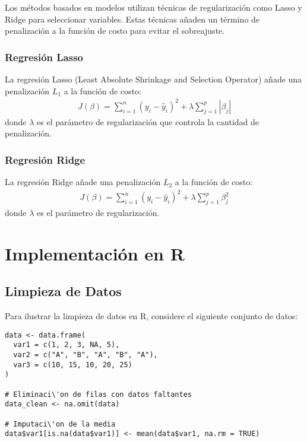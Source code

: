 \documentclass[a4paper]{report} %
\begin{document}
Los m\'etodos basados en modelos utilizan t\'ecnicas de regularizaci\'on como Lasso y Ridge para seleccionar variables. Estas t\'ecnicas a\~naden un t\'ermino de penalizaci\'on a la funci\'on de costo para evitar el sobreajuste.

\subsubsection{Regresi\'on Lasso}

La regresi\'on Lasso (Least Absolute Shrinkage and Selection Operator) a\~nade una penalizaci\'on $L_1$ a la funci\'on de costo:
\begin{eqnarray*}
J(\beta) = \sum_{i=1}^{n} (y_i - \hat{y}_i)^2 + \lambda \sum_{j=1}^{p} |\beta_j|
\end{eqnarray*}
donde $\lambda$ es el par\'ametro de regularizaci\'on que controla la cantidad de penalizaci\'on.

\subsubsection{Regresi\'on Ridge}

La regresi\'on Ridge a\~nade una penalizaci\'on $L_2$ a la funci\'on de costo:
\begin{eqnarray*}
J(\beta) = \sum_{i=1}^{n} (y_i - \hat{y}_i)^2 + \lambda \sum_{j=1}^{p} \beta_j^2
\end{eqnarray*}
donde $\lambda$ es el par\'ametro de regularizaci\'on.

\section{Implementaci\'on en R}

\subsection{Limpieza de Datos}

Para ilustrar la limpieza de datos en R, considere el siguiente conjunto de datos:
\begin{verbatim}
data <- data.frame(
  var1 = c(1, 2, 3, NA, 5),
  var2 = c("A", "B", "A", "B", "A"),
  var3 = c(10, 15, 10, 20, 25)
)

# Eliminaci\'on de filas con datos faltantes
data_clean <- na.omit(data)

# Imputaci\'on de la media
data$var1[is.na(data$var1)] <- mean(data$var1, na.rm = TRUE)
\end{verbatim}
\end{document}

